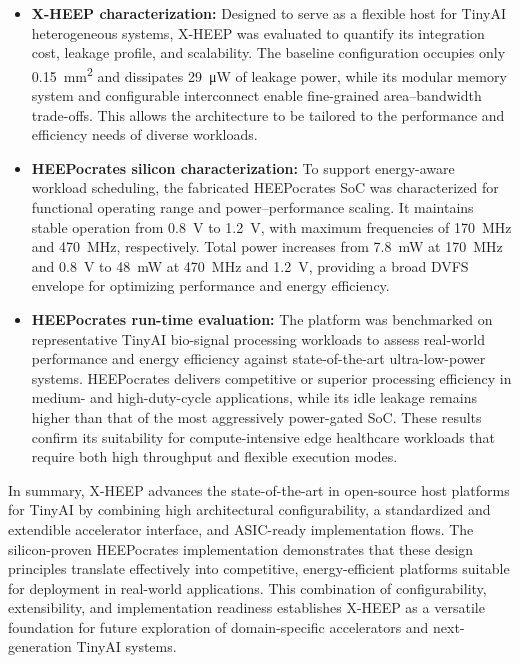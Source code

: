             \vspace{-1em}
            \begin{itemize}
                \item \textbf{X-HEEP characterization:} Designed to serve as a flexible host for TinyAI heterogeneous systems, \mbox{X-HEEP} was evaluated to quantify its integration cost, leakage profile, and scalability. The baseline configuration occupies only \SI{0.15}{\milli\meter\squared} and dissipates \SI{29}{\micro\watt} of leakage power, while its modular memory system and configurable interconnect enable fine-grained area–bandwidth trade-offs. This allows the architecture to be tailored to the performance and efficiency needs of diverse workloads.
            
                \item \textbf{HEEPocrates silicon characterization:} To support energy-aware workload scheduling, the fabricated \mbox{HEEPocrates} SoC was characterized for functional operating range and power–performance scaling. It maintains stable operation from \SI{0.8}{\volt} to \SI{1.2}{\volt}, with maximum frequencies of \SI{170}{\mega\hertz} and \SI{470}{\mega\hertz}, respectively. Total power increases from \SI{7.8}{\milli\watt} at \SI{170}{\mega\hertz} and \SI{0.8}{\volt} to \SI{48}{\milli\watt} at \SI{470}{\mega\hertz} and \SI{1.2}{\volt}, providing a broad DVFS envelope for optimizing performance and energy efficiency.
            
                \item \textbf{HEEPocrates run-time evaluation:} The platform was benchmarked on representative TinyAI bio-signal processing workloads to assess real-world performance and energy efficiency against state-of-the-art ultra-low-power systems. \mbox{HEEPocrates} delivers competitive or superior processing efficiency in medium- and high-duty-cycle applications, while its idle leakage remains higher than that of the most aggressively power-gated SoC. These results confirm its suitability for compute-intensive edge healthcare workloads that require both high throughput and flexible execution modes.
            \end{itemize}
            \vspace{-1em}
            
            In summary, \mbox{X-HEEP} advances the state-of-the-art in open-source host platforms for TinyAI by combining high architectural configurability, a standardized and extendible accelerator interface, and ASIC-ready implementation flows. The silicon-proven \mbox{HEEPocrates} implementation demonstrates that these design principles translate effectively into competitive, energy-efficient platforms suitable for deployment in real-world applications. This combination of configurability, extensibility, and implementation readiness establishes \mbox{X-HEEP} as a versatile foundation for future exploration of domain-specific accelerators and next-generation TinyAI systems.
        
